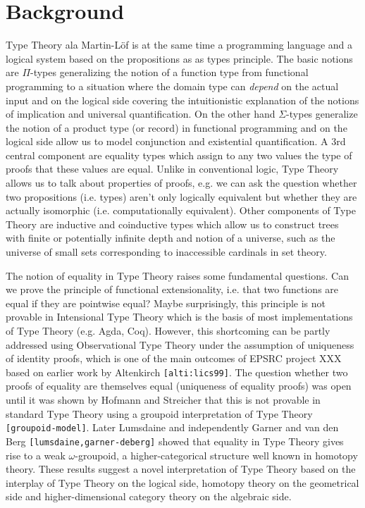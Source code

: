 \documentclass[twocolumn,a4paper]{article}
\renewcommand{\cite}[1]{{\tt[#1]}}
\begin{document}
\section{Background}

Type Theory ala Martin-L\"of is at the same time a programming
language and a logical system based on the propositions as as types
principle. The basic notions are $\Pi$-types generalizing the notion
of a function type from functional programming to a situation where
the domain type can \emph{depend} on the actual input and on the
logical side covering the intuitionistic  explanation of the notions of 
implication and universal quantification. On the other hand
$\Sigma$-types generalize the notion of a product type (or record) in
functional programming and on the logical side allow us to model
conjunction and existential quantification. A 3rd central component are
equality types which assign to any two values the type of proofs that 
these values are equal. Unlike in conventional logic, Type Theory
allows us to talk about properties of proofs, e.g. we can ask the
question whether two propositions (i.e. types) aren't only logically
equivalent but whether they are actually isomorphic
(i.e. computationally equivalent). Other components of Type Theory are
inductive and coinductive types which allow us to construct trees
with finite or potentially infinite depth and notion of a universe,
such as the universe of small sets corresponding to inaccessible
cardinals in set theory.

The notion of equality in Type Theory raises some fundamental questions. 
Can we prove the principle of functional extensionality, i.e. that two
functions are equal if they are pointwise equal? Maybe surprisingly,
this principle is not provable in Intensional Type Theory which is the
basis of most implementations of Type Theory (e.g. Agda,
Coq). However, this shortcoming can be partly addressed using
Observational Type Theory under the assumption of uniqueness of
identity proofs, which is one of the main outcomes of EPSRC project
XXX based on earlier work by Altenkirch \cite{alti:lics99}.  The
question whether two proofs of equality are themselves equal
(uniqueness of equality proofs) was open until it was shown by Hofmann
and Streicher that this is not provable in standard Type Theory using
a groupoid interpretation of Type Theory \cite{groupoid-model}. Later
Lumsdaine and independently Garner and van den Berg
\cite{lumsdaine,garner-deberg} showed that equality in Type Theory
gives rise to a weak $\omega$-groupoid, a higher-categorical structure
well known in homotopy theory. These results suggest a novel
interpretation of Type Theory based on the interplay of Type Theory on
the logical side, homotopy theory on the geometrical side and
higher-dimensional category theory on the algebraic side.
\end{document}
